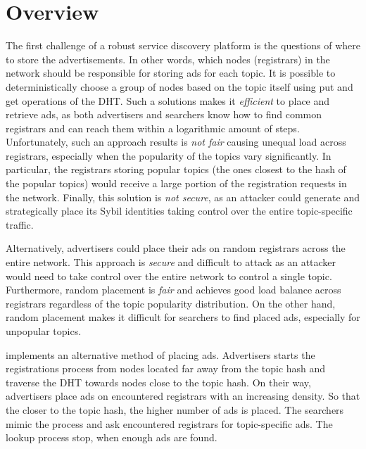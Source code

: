 \section{Overview}
\label{sec:overview}
 The first challenge of a robust service discovery platform is the questions of where to store the advertisements. In other words, which nodes (registrars) in the network should be responsible for storing ads for each topic. It is possible to deterministically choose a group of nodes based on the topic itself using put and get operations of the DHT. Such a solutions makes it \emph{efficient} to place and retrieve ads, as both advertisers and searchers know how to find common registrars and can reach them within a logarithmic amount of steps. Unfortunately, such an approach results is \emph{not fair} causing unequal load across registrars, especially when the popularity of the topics vary significantly. In particular, the registrars storing popular topics (\ie the ones closest to the hash of the popular topics) would receive a large portion of the registration requests in the network. Finally, this solution is \emph{not secure}, as an attacker could generate and strategically place its Sybil identities taking control over the entire topic-specific traffic. 


Alternatively, advertisers could place their ads on random registrars across the entire network. This approach is \emph{secure} and difficult to attack as an attacker would need to take control over the entire network to control a single topic. Furthermore, random placement is \emph{fair} and achieves good load balance across registrars regardless of the topic popularity distribution. On the other hand, random placement makes it difficult for searchers to find placed ads, especially for unpopular topics. 



\sysname implements an alternative method of placing ads. Advertisers starts the registrations process from nodes located far away from the topic hash and traverse the DHT towards nodes close to the topic hash. On their way, advertisers place ads on encountered registrars with an increasing density. So that the closer to the topic hash, the higher number of ads is placed. The searchers mimic the process and ask encountered registrars for topic-specific ads. The lookup process stop, when enough ads are found. 

